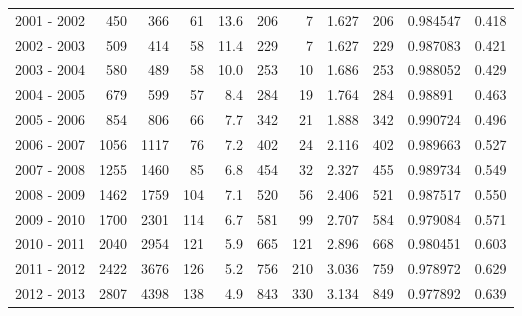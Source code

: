 \begin{tabular}{lrrrrrrrllr}
2001 - 2002 &      450 &      366 &                61 &              13.6 &                     206 &                          7 &       1.627 &           206 &   0.984547 &             0.418 \\
2002 - 2003 &      509 &      414 &                58 &              11.4 &                     229 &                          7 &       1.627 &           229 &   0.987083 &             0.421 \\
2003 - 2004 &      580 &      489 &                58 &              10.0 &                     253 &                         10 &       1.686 &           253 &   0.988052 &             0.429 \\
2004 - 2005 &      679 &      599 &                57 &               8.4 &                     284 &                         19 &       1.764 &           284 &    0.98891 &             0.463 \\
2005 - 2006 &      854 &      806 &                66 &               7.7 &                     342 &                         21 &       1.888 &           342 &   0.990724 &             0.496 \\
2006 - 2007 &     1056 &     1117 &                76 &               7.2 &                     402 &                         24 &       2.116 &           402 &   0.989663 &             0.527 \\
2007 - 2008 &     1255 &     1460 &                85 &               6.8 &                     454 &                         32 &       2.327 &           455 &   0.989734 &             0.549 \\
2008 - 2009 &     1462 &     1759 &               104 &               7.1 &                     520 &                         56 &       2.406 &           521 &   0.987517 &             0.550 \\
2009 - 2010 &     1700 &     2301 &               114 &               6.7 &                     581 &                         99 &       2.707 &           584 &   0.979084 &             0.571 \\
2010 - 2011 &     2040 &     2954 &               121 &               5.9 &                     665 &                        121 &       2.896 &           668 &   0.980451 &             0.603 \\
2011 - 2012 &     2422 &     3676 &               126 &               5.2 &                     756 &                        210 &       3.036 &           759 &   0.978972 &             0.629 \\
2012 - 2013 &     2807 &     4398 &               138 &               4.9 &                     843 &                        330 &       3.134 &           849 &   0.977892 &             0.639 \\

\end{tabular}
